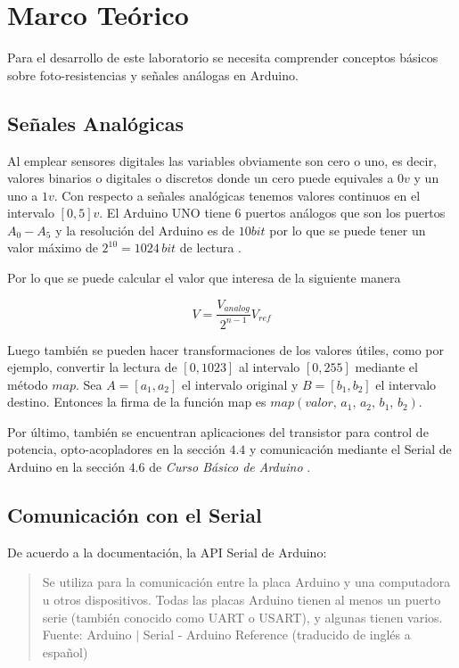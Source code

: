 \documentclass{article}
\begin{document}
    \section{Marco Teórico}

    Para el desarrollo de este laboratorio se necesita comprender conceptos
    básicos sobre foto-resistencias y señales análogas en Arduino.

    \subsection{Señales Analógicas}

    Al emplear sensores digitales las variables obviamente son cero o uno, es
    decir, valores binarios o digitales o discretos donde un cero puede
    equivales a $0v$ y un uno a $1v$. Con respecto a señales analógicas
    tenemos valores continuos en el intervalo $[0, 5]v$. El Arduino UNO tiene
    6 puertos análogos que son los puertos $A_0 - A_5$ y la resolución del
    Arduino es de $10 bit$ por lo que se puede tener un valor máximo de
    $2^{10} = 1024 \, bit$ de lectura \cite{flores-2018}.

    \bigbreak

    Por lo que se puede calcular el valor que interesa de la siguiente manera

    $$
    V = \frac{V_{analog}}{2^{n-1}} V_{ref}
    $$

    Luego también se pueden hacer transformaciones de los valores útiles,
    como por ejemplo, convertir la lectura de $[0, 1023]$ al intervalo $[0,
    255]$ mediante el método $map$. Sea $A = [a_1, a_2]$ el intervalo
    original y $B = [b_1, b_2]$ el intervalo destino. Entonces la firma de la
    función map es $map(valor, \, a_1, \, a_2, \, b_1, \, b_2)$.

    \bigbreak

    Por último, también se encuentran aplicaciones del transistor para
    control de potencia, opto-acopladores en la sección $4.4$ y comunicación
    mediante el Serial de Arduino en la sección $4.6$ de \textit{Curso Básico
    de Arduino} \cite{flores-2018}.

    \subsection{Comunicación con el Serial}

    De acuerdo a la documentación, la API Serial de Arduino:

    \begin{quote}
        Se utiliza para la comunicación entre la placa Arduino y una
        computadora u otros dispositivos. Todas las placas Arduino tienen al
        menos un puerto serie (también conocido como UART o USART), y algunas
        tienen varios.\\ \footnotesize
        Fuente: Arduino $\mid$ Serial - Arduino Reference (traducido de
        inglés a español) \cite{arduino-serial}
    \end{quote}
\end{document}
